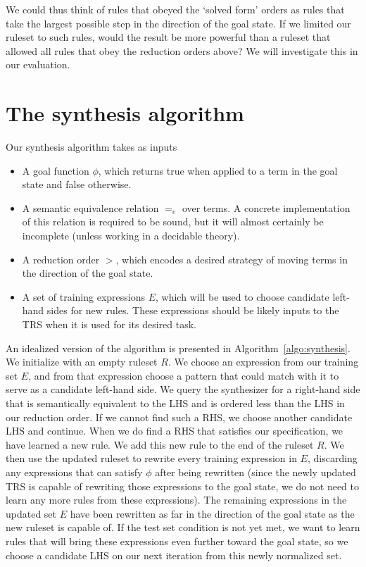 We could thus think of rules that obeyed the `solved form' orders as rules that take the largest possible step in the direction of the goal state. If we limited our ruleset to such rules, would the result be more powerful than a ruleset that allowed all rules that obey the reduction orders above? We will investigate this in our evaluation.

\section{The synthesis algorithm}

Our synthesis algorithm takes as inputs 

\begin{itemize}
\item A goal function $\phi$, which returns true when applied to a term in the goal state and false otherwise. 
\item A semantic equivalence relation $=_e$ over terms. A concrete implementation of this relation is required to be sound, but it will almost certainly be incomplete (unless working in a decidable theory).
\item A reduction order $>$, which encodes a desired strategy of moving terms in the direction of the goal state.
\item A set of training expressions $E$, which will be used to choose candidate left-hand sides for new rules. These expressions should be likely inputs to the TRS when it is used for its desired task.
\end{itemize}

An idealized version of the algorithm is presented in Algorithm~\ref{algo:synthesis}. We initialize with an empty ruleset $R$. We choose an expression from our training set $E$, and from that expression choose a pattern that could match with it to serve as a candidate left-hand side. We query the synthesizer for a right-hand side that is semantically equivalent to the LHS and is ordered less than the LHS in our reduction order. If we cannot find such a RHS, we choose another candidate LHS and continue. When we do find a RHS that satisfies our specification, we have learned a new rule. We add this new rule to the end of the ruleset $R$. We then use the updated ruleset to rewrite every training expression in $E$, discarding any expressions that can satisfy $\phi$ after being rewritten (since the newly updated TRS is capable of rewriting those expressions to the goal state, we do not need to learn any more rules from these expressions). The remaining expressions in the updated set $E$ have been rewritten as far in the direction of the goal state as the new ruleset is capable of. If the test set condition is not yet met, we want to learn rules that will bring these expressions even further toward the goal state, so we choose a candidate LHS on our next iteration from this newly normalized set.

